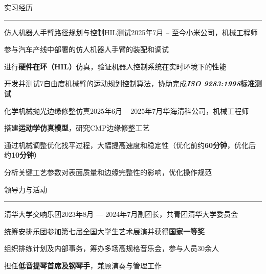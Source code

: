 \documentclass{resume} %
\renewenvironment{rSection}[1]{
\sectionskip
\textcolor{TsinghuaPurple}{\MakeUppercase{#1}}
\sectionlineskip
\hrule
\begin{list}{}{
\setlength{\leftmargin}{0em}
}
\item[]
}{
\end{list}
}
\begin{document}

\begin{rSection}{实习经历}

\begin{rSubsection}{仿人机器人手臂路径规划与控制HIL测试}{2025年7月 -- 至今}{小米公司，机械工程师}{}
    \item 参与汽车产线中部署的仿人机器人手臂的装配和调试
    \item 进行\textbf{硬件在环（HIL）}仿真，验证机器人控制系统在实时环境下的性能
    \item 开发并测试7自由度机械臂的运动规划控制算法，协助完成\textbf{\textit{ISO 9283:1998}标准测试}
\end{rSubsection}

\begin{rSubsection}{化学机械抛光边缘修整仿真}{2025年6月 -- 2025年7月}{华海清科公司，机械工程师}{}
\item 搭建\textbf{运动学仿真模型}，研究CMP边缘修整工艺
\item 通过机械调整优化找平过程，大幅提高速度和稳定性（优化前约\textbf{60分钟}，优化后约\textbf{10分钟}）
\item 分析关键工艺参数对表面质量和边缘完整性的影响，优化操作规范
\end{rSubsection}

\end{rSection}


\begin{rSection}{领导力与活动}

\begin{rSubsection}{清华大学交响乐团}{2023年8月 --- 2024年7月}{副团长，共青团清华大学委员会}{}              
\item 统筹安排乐团参加第七届全国大学生艺术展演并获得\textbf{国家一等奖}
\item 组织排练计划及内部事务，筹办多场高规格音乐会，参与人员30余人
\item 担任\textbf{低音提琴首席及钢琴手}，兼顾演奏与管理工作
\end{rSubsection}  

\end{rSection}
\end{document}
